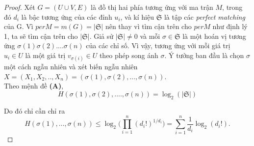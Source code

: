 \documentclass[a4paper, 12pt]{report}
\begin{document}
\begin{proof}
 Xét $G=(U \cup V,E)$ là đồ thị hai phía tương ứng với ma trận $M$, trong đó $d_{i}$ là bậc tương ứng của các đỉnh $u_{i}$, và kí hiệu $\mathfrak{S}$ là tập các \textit{perfect matching} của G. Vì $per M=m(G) = |\mathfrak{S}|$ nên thay vì tìm cận trên cho $per M$ như định lý 1, ta sẽ tìm cận trên cho $|\mathfrak{S}|$. Giả sử $|\mathfrak{S}| \neq 0$ và mỗi $\sigma \in \mathfrak{S}$ là một hoán vị tương ứng $\sigma (1) \sigma (2) ....  \sigma (n)$ của các chỉ số. Vì vậy, tương ứng với mỗi giá trị $u_{i} \in U$ là một giá trị $v_{\sigma(i)} \in U$ theo phép song ánh $\sigma$. Ý tưởng ban đầu là chọn $\sigma$ một cách ngẫu nhiên và xét biến ngẫu nhiên $X=(X_{1},X_{2},..,X_{n}) = (\sigma(1),\sigma(2),...,\sigma(n)).$
\\
Theo mệnh đề \textbf{(A)},
\begin{equation*}
H(\sigma (1), \sigma (2), ....  ,\sigma (n)) = \log_{2}(|\mathfrak{S}|)
\end{equation*}

Do đó chỉ cần chỉ ra
\begin{equation}
    H(\sigma(1),...,\sigma(n)) \leq \log_{2}\Big(\prod_{i=1}^{n}(d_{i}!)^{1/d_{i}}\Big) = \sum_{i=1}^{n}\frac{1}{d_{i}}\log_{2}(d_{i}!).
\end{equation}


\end{proof}
\end{document}
